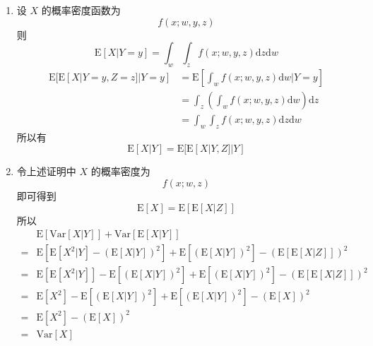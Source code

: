 \documentclass[11pt,letter,notitlepage]{article}
\newcommand{\expect}[1]{\text{E} [#1]}
\newcommand{\var}[1]{\text{Var} [#1]}
\begin{document}
\begin{solution}
	\begin{enumerate}
		\item 设 $X$ 的概率密度函数为 $$f(x;w,y,z)$$
		      则 $$\expect {X|Y=y}=\int_{w} \int_{z} f(x;w,y,z) \mathrm{d}z \mathrm{d}w $$
		      $$\begin{aligned}
				      \expect{ \expect{X|Y=y,Z=z} |Y=y}
				       & = \expect{ \int_{w} f(x;w,y,z) \mathrm{d}w |Y=y}                      \\
				       & = \int_{z} \left( \int_{w} f(x;w,y,z) \mathrm{d}w \right) \mathrm{d}z \\
				       & =\int_{w} \int_{z} f(x;w,y,z) \mathrm{d}z \mathrm{d}w
			      \end{aligned}$$
		      所以有 $$\expect{X|Y} = \expect{ \expect{X|Y,Z} |Y}$$
		\item 令上述证明中 $X$ 的概率密度为 $$f(x;w,z)$$
		      即可得到 $$\expect{X} = \expect{ \expect{X|Z}}$$
		      所以
		      $$\begin{aligned}
				        & \expect{\var{X|Y}}+\var{\expect{X|Y}}                                           \\
				      = & \expect{ \expect{X^2|Y}-\left( \expect{X|Y} \right)^2 }
				      + \expect{ \left( \expect{X|Y} \right)^2} - \left( \expect{ \expect{X|Z}} \right)^2 \\
				      = & \expect{ \expect{X^2|Y} }- \expect{\left( \expect{X|Y} \right)^2 }
				      + \expect{ \left( \expect{X|Y} \right)^2} - \left( \expect{ \expect{X|Z}} \right)^2 \\
				      = & \expect{ X^2 }- \expect{\left( \expect{X|Y} \right)^2 }
				      + \expect{ \left( \expect{X|Y} \right)^2} - \left( \expect{X} \right)^2             \\
				      = & \expect{ X^2 }- \left( \expect{X} \right)^2                                     \\
				      = & \var{X}
			      \end{aligned}$$
	\end{enumerate}
\end{solution}
\end{document}
